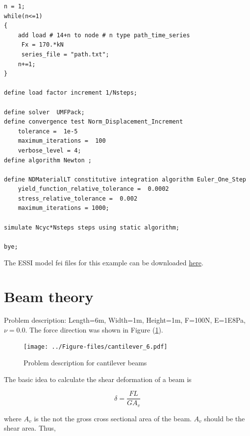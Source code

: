 \documentclass[fleqn,11pt]{article}
\begin{document}
\begin{lstlisting}
n = 1;
while(n<=1)
{
    add load # 14+n to node # n type path_time_series 
     Fx = 170.*kN 
     series_file = "path.txt";        
    n+=1;
}

define load factor increment 1/Nsteps;

define solver  UMFPack;
define convergence test Norm_Displacement_Increment  
    tolerance =  1e-5
    maximum_iterations =  100
    verbose_level = 4;
define algorithm Newton ;

define NDMaterialLT constitutive integration algorithm Euler_One_Step
    yield_function_relative_tolerance =  0.0002
    stress_relative_tolerance =  0.002
    maximum_iterations = 1000;

simulate Ncyc*Nsteps steps using static algorithm;

bye;    
\end{lstlisting}

The    ESSI   model   fei   files   for   this   example   can   be   downloaded
\href{https://github.com/BorisJeremic/Real-ESSI-Examples/blob/master/model_fei_file/shearbeam_pisano_plastic8NodeBrickLT_DruckerPragerArmstrongFrederick/8NodeBrickLT_DruckerPragerArmstrongFrederick.tgz?raw=true}{here}.









\section{Beam theory}

Problem description: Length=6m, Width=1m, Height=1m, F=100N, E=1E8Pa, $\nu=0.0$. The force direction was shown in Figure (\ref{fig Problem description for cantilever beam theory}). 

\begin{figure}[H]
  \centering
  \texttt{[image: ../Figure-files/cantilever\_6.pdf]}
  \caption{Problem description for cantilever beams}
  \label{fig Problem description for cantilever beam theory}
\end{figure}


The basic idea to calculate the shear deformation of a beam is 

\begin{equation}
  \delta=\frac{FL}{GA_v}
\end{equation}

where $A_v$ is the not the gross cross sectional area of the beam. $A_v$ should be the shear area. Thus,
\end{document}
